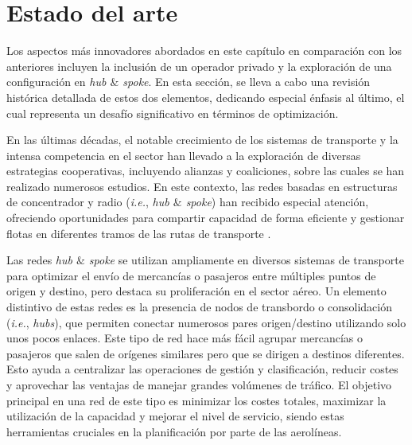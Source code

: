 \section{Estado del arte} \label{S:intro_aero}

Los aspectos más innovadores abordados en este capítulo en comparación con los anteriores incluyen la inclusión de un operador privado y la exploración de una configuración en \emph{hub $\&$ spoke}. En esta sección, se lleva a cabo una revisión histórica detallada de estos dos elementos, dedicando especial énfasis al último, el cual representa un desafío significativo en términos de optimización.

En las últimas décadas, el notable crecimiento de los sistemas de transporte y la intensa competencia en el sector han llevado a la exploración de diversas estrategias cooperativas, incluyendo alianzas y coaliciones, sobre las cuales se han realizado numerosos estudios. En este contexto,
las redes basadas en estructuras de concentrador y radio (\emph{i.e.}, \emph{hub $\&$ spoke}) han recibido especial atención, ofreciendo oportunidades para compartir capacidad de forma eficiente y gestionar flotas en diferentes tramos de
las rutas de transporte \cite{adler2007hub}. 



Las redes \emph{hub $\&$ spoke} se  utilizan ampliamente en diversos sistemas de transporte para optimizar el envío de mercancías o pasajeros entre múltiples puntos de origen y destino, pero destaca su proliferación en el sector aéreo. Un elemento distintivo de estas redes es la presencia de nodos de transbordo o consolidación (\emph{i.e.}, \emph{hubs}), que permiten conectar numerosos pares origen/destino utilizando solo unos pocos enlaces. Este tipo de red hace más fácil agrupar mercancías o pasajeros que salen de orígenes similares pero que se dirigen a destinos diferentes. Esto ayuda a centralizar las operaciones de gestión y clasificación, reducir costes y aprovechar las ventajas de manejar grandes volúmenes de tráfico. 
El objetivo principal en una red de este tipo es minimizar los costes totales, maximizar la utilización de la capacidad y mejorar el nivel de servicio, siendo estas herramientas cruciales en la planificación por parte de las aerolíneas.

